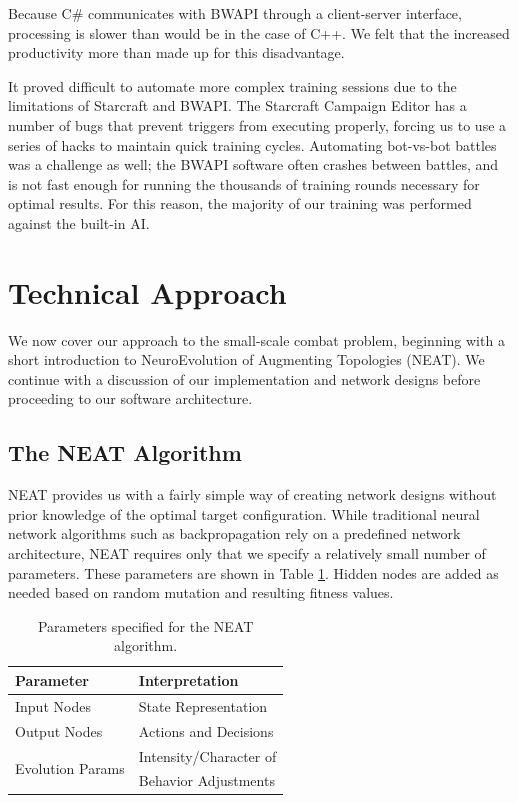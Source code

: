 \documentclass[10pt,a4paper,twocolumn]{article}
\begin{document}
Because C\# communicates with BWAPI through a client-server interface, processing is slower than would be in the case of C++. We felt that the increased productivity more than made up for this disadvantage.

It proved difficult to automate more complex training sessions due to the limitations of Starcraft and BWAPI. The Starcraft Campaign Editor has a number of bugs that prevent triggers from executing properly, forcing us to use a series of hacks to maintain quick training cycles. Automating bot-vs-bot battles was a challenge as well; the BWAPI software often crashes between battles, and is not fast enough for running the thousands of training rounds necessary for optimal results. For this reason, the majority of our training was performed against the built-in AI.

\section{Technical Approach}
\label{sec:tech}

We now cover our approach to the small-scale combat problem, beginning with a short introduction to NeuroEvolution of Augmenting Topologies (NEAT). We continue with a discussion of our implementation and network designs before proceeding to our software architecture.

\subsection{The NEAT Algorithm}
\label{sec:neat}

NEAT provides us with a fairly simple way of creating network designs without prior knowledge of the optimal target configuration. While traditional neural network algorithms such as backpropagation rely on a predefined network architecture, NEAT requires only that we specify a relatively small number of parameters. These parameters are shown in Table \ref{tab:neat_params}. Hidden nodes are added as needed based on random mutation and resulting fitness values.

\begin{table}
\centering
\begin{tabular}{|l|l|}
	\hline
	{\bf Parameter} & {\bf Interpretation}\\ \hline
	Input Nodes & State Representation\\ \hline
	Output Nodes & Actions and Decisions\\ \hline
	\multirow{2}{*}{Evolution Params} &  Intensity/Character of\\
	& Behavior Adjustments\\ \hline
\end{tabular}
\caption{Parameters specified for the NEAT algorithm.}
\label{tab:neat_params}
\end{table}
\end{document}

